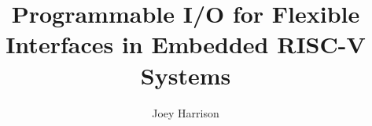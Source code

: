 
\author{Joey Harrison}
\title{Programmable I/O for Flexible Interfaces in Embedded RISC-V Systems}


